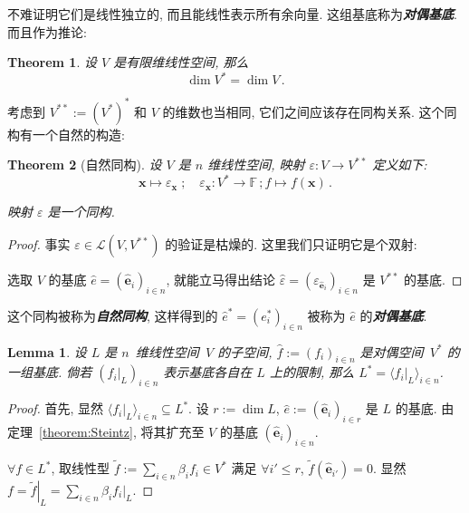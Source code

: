\documentclass[openany]{ctexbook}
\newcommand*{\indexbf}[1]{\emph{\textbf{#1}}\index{#1}} %
\theoremstyle{plain}
\newtheorem{theorem}{Theorem}[section] %
\newtheorem{lemma}{Lemma} %
\theoremstyle{definition}
\newcommand*{\basis}[1]{\hat{\boldsymbol{#1}}} %
\newcommand*{\bv}{\boldsymbol} %
\begin{document}
不难证明它们是线性独立的, 而且能线性表示所有余向量. 这组基底称为\indexbf{对偶基底}. 
而且作为推论:
\begin{theorem}
设 $V$ 是有限维线性空间, 那么
\begin{equation*}
	\dim V^* = \dim V\,.
\end{equation*}
\end{theorem}

考虑到 $V^{**} := (V^*)^*$ 和 $V$ 的维数也当相同, 它们之间应该存在同构关系. 这个同构有一个自然的构造:

\begin{theorem}[自然同构]
	设 $V$ 是 $n$ 维线性空间, 映射 $\varepsilon \colon V \to V^{**}$ 定义如下:
	\begin{equation*}
		\bv x \mapsto \varepsilon_{\bv x}\;; 
		\quad
		\varepsilon_{\bv x} \colon V^* \to \mathbb F\,; 
			f \mapsto f(\bv x)\,.
	\end{equation*}
	
	映射 $\varepsilon$ 是一个同构.
\end{theorem}
\begin{proof}
	事实 $\varepsilon \in \mathcal L(V, V^{**})$ 的验证是枯燥的. 
	这里我们只证明它是个双射:

	选取 $V$ 的基底 $\hat e = (\basis e_i)_{i \in n}$, 就能立马得出结论 $\hat \varepsilon = (\varepsilon_{\basis e_i})_{i \in n}$ 是 $V^{**}$ 的基底. 
\end{proof}

这个同构被称为\indexbf{自然同构}, 这样得到的 $\hat e^* = (e^*_i)_{i \in n}$ 被称为 $\hat e$ 的\indexbf{对偶基底}.

\begin{lemma}\label{lemma:子空间的对偶}
	设 $L$ 是 $n$~维线性空间~$V$ 的子空间, $\hat f := (f_i)_{i \in n}$ 是对偶空间~$V^*$ 的一组基底. 
	倘若 $(\left. f_i \right|_L)_{i \in n}$ 表示基底各自在 $L$ 上的限制,
	那么 $L^* = \langle \left. f_i \right|_L \rangle_{i \in n}$.
\end{lemma}
\begin{proof}
	首先, 显然 $\langle \left. f_i \right|_L \rangle_{i \in n} \subseteq L^*$.
	设 $r := \dim L$, $\hat e := (\basis e_i)_{i \in r}$ 是 $L$ 的基底. 
	由定理~\ref{theorem:Steintz}, 将其扩充至 $V$ 的基底 $(\basis e_i)_{i \in n}$.

	$\forall f \in L^*$, 取线性型 $\tilde f := \sum_{i \in n} \beta_i f_i \in V^*$ 满足 $\forall i' \leq r$, $\tilde f(\basis e_{i'}) = 0$. 
	显然 $f = \left. \tilde f \right|_L = \sum_{i \in n} \beta_i \left. f_i \right|_L$.
\end{proof}
\end{document}
